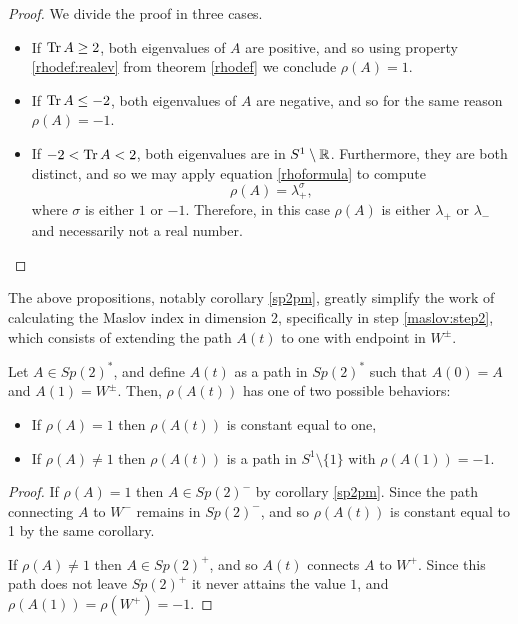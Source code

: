 \begin{proof}
We divide the proof in three cases.
\begin{itemize}
\item If $\operatorname{Tr} A \geq 2$, both eigenvalues of $A$ are positive, and so using property \ref{rhodef:realev} from theorem \ref{rhodef} we conclude $\rho(A) = 1$.
\item If $\operatorname{Tr} A \leq -2$, both eigenvalues of $A$ are negative, and so for the same reason $\rho(A) = -1$.
\item If $-2 < \operatorname{Tr} A < 2$, both eigenvalues are in $S^1 \setminus \mathbb{R}$. Furthermore, they are both distinct, and so we may apply equation \eqref{rhoformula} to compute
\begin{equation}\label{sp2pm:3}
\rho(A) = \lambda_+^\sigma,
\end{equation}
where $\sigma$ is either $1$ or $-1$. Therefore, in this case $\rho(A)$ is either $\lambda_+$ or $\lambda_-$ and necessarily not a real number.
\end{itemize}
\end{proof}

The above propositions, notably corollary \ref{sp2pm}, greatly simplify the work of calculating the Maslov index in dimension 2, specifically in step \ref{maslov:step2}, which consists of extending the path $A(t)$ to one with endpoint in $W^\pm$.

\begin{corollary}\label{sp2rhoextension}
Let $A \in Sp(2)^*$, and define $A(t)$ as a path in $Sp(2)^*$ such that $A(0) = A$ and $A(1) = W^\pm$. Then, $\rho(A(t))$ has one of two possible behaviors:
\begin{itemize}
\item If $\rho(A) = 1$ then $\rho(A(t))$ is constant equal to one,
\item If $\rho(A) \neq 1$ then $\rho(A(t))$ is a path in $S^1 \setminus \{1\}$ with $\rho(A(1)) = -1$.
\end{itemize}
\end{corollary}

\begin{proof}
If $\rho(A) = 1$ then $A \in Sp(2)^-$ by corollary \ref{sp2pm}. Since the path connecting $A$ to $W^-$ remains in $Sp(2)^-$, and so $\rho(A(t))$ is constant equal to 1 by the same corollary.

If $\rho(A) \neq 1$ then $A \in Sp(2)^+$, and so $A(t)$ connects $A$ to $W^+$. Since this path does not leave $Sp(2)^+$ it never attains the value $1$, and $\rho(A(1)) = \rho(W^+) = -1$.
\end{proof}


